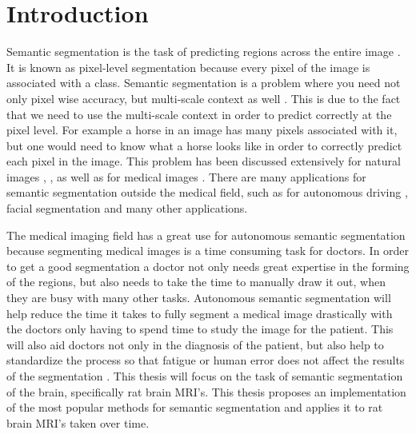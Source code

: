 \chapter{Introduction}
Semantic segmentation is the task of predicting regions across the entire image \cite{DBLP:journals/corr/abs-1809-10198semanticprogress}. 
It is known as pixel-level segmentation because every pixel of the image is associated with a class. 
Semantic segmentation is a problem where you need not only pixel wise accuracy, but multi-scale context as well \cite{Yu2016MultiScaleCA}. 
This is due to the fact that we need to use the multi-scale context in order to predict correctly at the pixel level. 
For example a horse in an image has many pixels associated with it, but one would need to know what a horse looks like in order to correctly predict each pixel in the image. 
This problem has been discussed extensively for natural images \cite{DBLP:journals/corr/LongSD14}, \cite{DBLP:journals/corr/ChenPSA17}, \cite{Yu2016MultiScaleCA} as well as for medical images \cite{DBLP:journals/corr/RonnebergerFB15}. 
There are many applications for semantic segmentation outside the medical field, such as for autonomous driving \cite{inbookautomous}, facial segmentation \cite{7350915face} and many other applications. 

The medical imaging field has a great use for autonomous semantic segmentation because segmenting medical images is a time consuming task for doctors.
In order to get a good segmentation a doctor not only needs great expertise in the forming of the regions, but also needs to take the time to manually draw it out, when they are busy with many other tasks.  
Autonomous semantic segmentation will help reduce the time it takes to fully segment a medical image drastically with the doctors only having to spend time to study the image for the patient.
This will also aid doctors not only in the diagnosis of the patient, but also help to standardize the process so that fatigue or human error does not affect the results of the segmentation \cite{SharmaAutomatedImageSegmentationTech}. 
This thesis will focus on the task of semantic segmentation of the brain, specifically rat brain MRI's.
This thesis proposes an implementation of the most popular methods for semantic segmentation and applies it to rat brain MRI's taken over time. 



